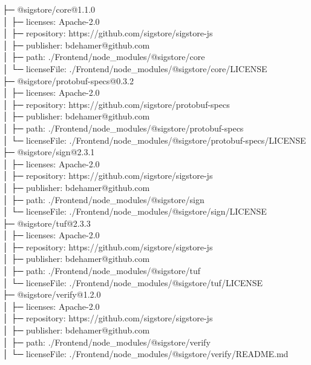 ├─ @sigstore/core@1.1.0\\
│  ├─ licenses: Apache-2.0\\
│  ├─ repository: https://github.com/sigstore/sigstore-js\\
│  ├─ publisher: bdehamer@github.com\\
│  ├─ path: ./Frontend/node\_modules/@sigstore/core\\
│  └─ licenseFile: ./Frontend/node\_modules/@sigstore/core/LICENSE\\
├─ @sigstore/protobuf-specs@0.3.2\\
│  ├─ licenses: Apache-2.0\\
│  ├─ repository: https://github.com/sigstore/protobuf-specs\\
│  ├─ publisher: bdehamer@github.com\\
│  ├─ path: ./Frontend/node\_modules/@sigstore/protobuf-specs\\
│  └─ licenseFile: ./Frontend/node\_modules/@sigstore/protobuf-specs/LICENSE\\
├─ @sigstore/sign@2.3.1\\
│  ├─ licenses: Apache-2.0\\
│  ├─ repository: https://github.com/sigstore/sigstore-js\\
│  ├─ publisher: bdehamer@github.com\\
│  ├─ path: ./Frontend/node\_modules/@sigstore/sign\\
│  └─ licenseFile: ./Frontend/node\_modules/@sigstore/sign/LICENSE\\
├─ @sigstore/tuf@2.3.3\\
│  ├─ licenses: Apache-2.0\\
│  ├─ repository: https://github.com/sigstore/sigstore-js\\
│  ├─ publisher: bdehamer@github.com\\
│  ├─ path: ./Frontend/node\_modules/@sigstore/tuf\\
│  └─ licenseFile: ./Frontend/node\_modules/@sigstore/tuf/LICENSE\\
├─ @sigstore/verify@1.2.0\\
│  ├─ licenses: Apache-2.0\\
│  ├─ repository: https://github.com/sigstore/sigstore-js\\
│  ├─ publisher: bdehamer@github.com\\
│  ├─ path: ./Frontend/node\_modules/@sigstore/verify\\
│  └─ licenseFile: ./Frontend/node\_modules/@sigstore/verify/README.md\\
